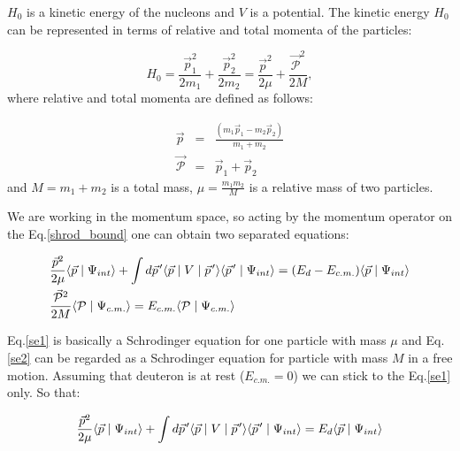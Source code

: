     $H_0$ is a kinetic energy of the nucleons and $V$ is a potential. 
    The kinetic energy $H_0$ can be represented in terms of  relative and total momenta
    of the particles:

    \begin{equation}
        H_0 = \frac{\vec{p}_1^2}{2m_1} + \frac{\vec{p}_2^2}{2m_2} = 
        \frac{\vec{p}^2}{2\mu} + \frac{\vec{\mathcal{P}}^2}{2M}, 
    \end{equation}
    where relative and total momenta are defined as follows:

    \begin{eqnarray}
        \vec{p} &=& \frac{(m_1\vec{p}_1 - m_2\vec{p}_2)}{m_1 + m_2}\\
        \vec{\mathcal{P}} &=& \vec{p}_1 + \vec{p}_2
    \end{eqnarray}
    and $M = m_1 + m_2$ is a total mass, $\mu = \frac{m_1m_2}{M}$ is a relative mass of two particles.

    We are working in the momentum space, so acting by the momentum operator
    on the Eq.\ref*{shrod_bound} one can obtain two separated equations:

    \begin{eqnarray}
        &\frac{\vec{p}^2}{2\mu} \langle \vec{p} \mid \Psi_{int} \rangle +
        \int d \pvec{p}^\prime \langle \vec{p} \mid V \mid \pvec{p}^\prime \rangle
        \langle \pvec{p}^\prime \mid \Psi_{int} \rangle = 
        (E_d - E_{c.m.})\langle \vec{p} \mid \Psi_{int} \rangle \label{se1}\\
        &\frac{\vec{\mathcal{P}}^2}{2M} \langle \mathcal{P} \mid \Psi_{c.m.} \rangle = 
        E_{c.m.}\langle \mathcal{P} \mid \Psi_{c.m.} \rangle \label{se2}
    \end{eqnarray}

    Eq.\ref{se1} is basically a Schrodinger equation for one particle with mass $\mu$ 
    and Eq.\ref{se2} can be regarded as a Schrodinger equation for particle with mass $M$ in 
    a free motion. Assuming that deuteron is at rest ($E_{c.m.} = 0$) we can stick 
    to the Eq.\ref{se1} only. So that:

    \begin{equation}
        \frac{\vec{p}^2}{2\mu} \langle \vec{p} \mid \Psi_{int} \rangle +
        \int d \pvec{p}^\prime \langle \vec{p} \mid V \mid \pvec{p}^\prime \rangle
        \langle \pvec{p}^\prime \mid \Psi_{int} \rangle = 
        E_d \langle \vec{p} \mid \Psi_{int} \rangle
    \end{equation}


